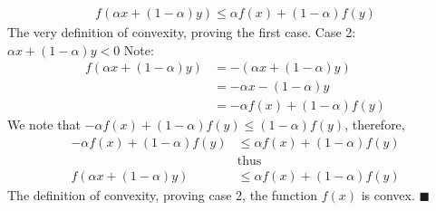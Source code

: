 \documentclass{article}
\begin{document}
\begin{align*}
 f(\alpha x + (1 - \alpha)y) \leq \alpha f(x) + (1 - \alpha)f(y)
\end{align*}
The very definition of convexity, proving the first case.
\newline
Case 2: $\alpha x + (1 - \alpha)y < 0$ \newline
Note:
\begin{align*}
    f(\alpha x + (1 - \alpha)y) & = -(\alpha x + (1 - \alpha)y) \\
    & = - \alpha x - (1 - \alpha)y \\
    & = - \alpha f(x) + (1 - \alpha)f(y)
\end{align*}
We note that $- \alpha f(x) + (1 - \alpha)f(y) \leq (1 - \alpha)f(y)$, therefore,
\begin{align*} 
    - \alpha f(x) + (1 - \alpha)f(y) & \leq \alpha f(x) + (1 - \alpha)f(y) \\
    & \text{thus} \\
    f(\alpha x + (1 - \alpha)y) & \leq \alpha f(x) + (1 - \alpha)f(y)
\end{align*}
The definition of convexity, proving case 2, the function $f(x)$ is convex. $\blacksquare$
\end{document}
